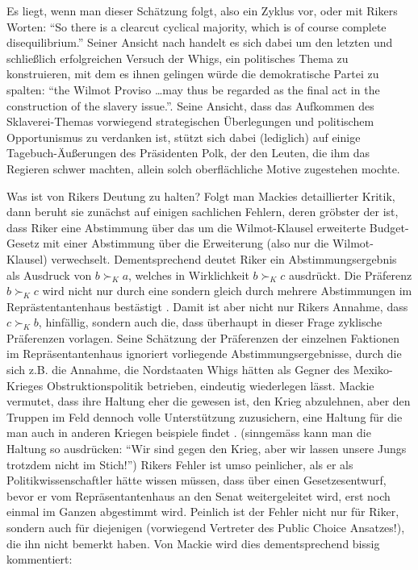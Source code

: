 Es liegt, wenn man dieser Schätzung folgt, also ein Zyklus vor, oder mit Rikers
Worten: ``So there is a clearcut cyclical majority, which is of course complete
disequilibrium.''\cite[S. 227]{riker:1982} Seiner Ansicht nach handelt es sich
dabei um den letzten und schließlich erfolgreichen Versuch der Whigs, ein
politisches Thema zu konstruieren, mit dem es ihnen gelingen würde die
demokratische Partei zu spalten: ``the Wilmot Proviso \ldots may thus be
regarded as the final act in the construction of the slavery issue.''\cite[S.
227]{riker:1982}. Seine Ansicht, dass das Aufkommen des Sklaverei-Themas 
vorwiegend strategischen Überlegungen und politischem Opportunismus zu
verdanken ist, stützt sich dabei (lediglich) auf einige Tagebuch-Äußerungen des
Präsidenten Polk, der den Leuten, die ihm das Regieren schwer machten, allein
solch oberflächliche Motive zugestehen mochte.

Was ist von Rikers Deutung zu halten? Folgt man Mackies detaillierter Kritik,
dann beruht sie zunächst auf einigen sachlichen Fehlern, deren gröbster der
ist, dass Riker eine Abstimmung über das um die Wilmot-Klausel erweiterte
Budget-Gesetz mit einer Abstimmung über die Erweiterung (also nur die
Wilmot-Klausel) verwechselt. Dementsprechend deutet Riker ein
Abstimmungsergebnis als Ausdruck von $b \succ_K a$, welches in Wirklichkeit $b
\succ_K c$ ausdrückt. Die Präferenz $b \succ_K c$ wird nicht nur durch eine
sondern gleich durch mehrere Abstimmungen im Reprästentantenhaus bestästigt
\cite[S. 243ff.]{mackie:2003}. Damit ist aber nicht nur Rikers Annahme, dass $c
\succ_K b$, hinfällig, sondern auch die, dass überhaupt in dieser Frage
zyklische Präferenzen vorlagen. Seine Schätzung der Präferenzen der einzelnen
Faktionen im Repräsentantenhaus ignoriert vorliegende Abstimmungsergebnisse,
durch die sich z.B. die Annahme, die Nordstaaten Whigs hätten als Gegner des
Mexiko-Krieges Obstruktionspolitik betrieben, eindeutig wiederlegen lässt.
Mackie vermutet, dass ihre Haltung eher die gewesen ist, den Krieg abzulehnen,
aber den Truppen im Feld dennoch volle Unterstützung zuzusichern, eine Haltung
für die man auch in anderen Kriegen beispiele findet \cite[S. 248]{mackie:2003}.
(sinngemäss kann man die Haltung so ausdrücken: ``Wir sind gegen den Krieg, aber
wir lassen unsere Jungs trotzdem nicht im Stich!'') Rikers Fehler ist umso
peinlicher, als er als Politikwissenschaftler hätte wissen müssen, dass über
einen Gesetzesentwurf, bevor er vom Repräsentantenhaus an den Senat
weitergeleitet wird, erst noch einmal im Ganzen abgestimmt wird. Peinlich ist
der Fehler nicht nur für Riker, sondern auch für diejenigen (vorwiegend
Vertreter des Public Choice Ansatzes!), die ihn nicht bemerkt haben. Von Mackie
wird dies dementsprechend bissig kommentiert:

